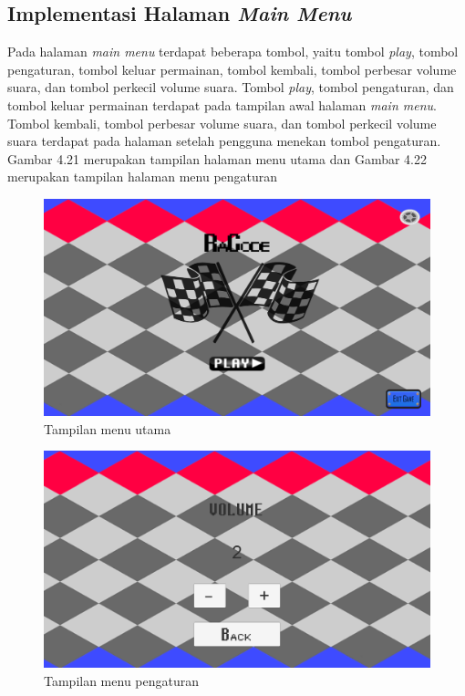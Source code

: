	\subsection{Implementasi Halaman \textit{Main Menu}}
	Pada halaman \textit{main menu} terdapat beberapa tombol, yaitu tombol \textit{play}, tombol pengaturan, tombol keluar permainan, tombol kembali, tombol perbesar volume suara, dan tombol perkecil volume suara. Tombol \textit{play}, tombol pengaturan, dan tombol keluar permainan terdapat pada tampilan awal halaman \textit{main menu}. Tombol kembali, tombol perbesar volume suara, dan tombol perkecil volume suara terdapat pada halaman setelah pengguna menekan tombol pengaturan. Gambar 4.21 merupakan tampilan halaman menu utama dan Gambar 4.22 merupakan tampilan halaman menu pengaturan
	\begin{figure}
		\centering
		\includegraphics[width=\linewidth-40pt]{pics/prototipe/menu1}
		\caption{Tampilan menu utama}
	\end{figure}
	\begin{figure}
		\centering
		\includegraphics[width=\linewidth-40pt]{pics/prototipe/menu2}
		\caption{Tampilan menu pengaturan}
	\end{figure}
